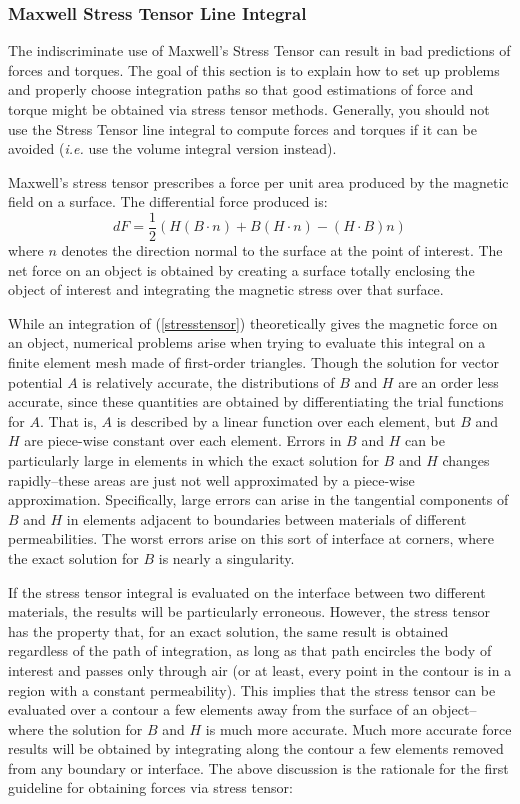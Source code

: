 \documentclass[12pt]{report}
\newcommand{\be}{\begin{equation}}
\newcommand{\ee}{\end{equation}}
\begin{document}
\subsubsection{Maxwell Stress Tensor Line Integral}
The indiscriminate use of Maxwell's Stress Tensor can result in bad
predictions of forces and torques.  The goal of this section is to
explain how to set up problems and properly choose integration
paths so that good estimations of force and torque might be
obtained via stress tensor methods.  Generally, you should not
use the Stress Tensor line integral to compute forces and torques
if it can be avoided ({\em i.e.} use the volume integral version instead).

Maxwell's stress tensor prescribes a force per unit area produced
by the magnetic field on a surface.  The differential force
produced is:
\be \label{stresstensor} dF= \mbox{$\frac{1}{2}$} \left(
H(B \cdot n) + B(H \cdot n) - (H \cdot B) n \right) \ee where $n$
denotes the direction normal to the surface at the point of
interest.  The net force on an object is obtained by creating a
surface totally enclosing the object of interest and integrating
the magnetic stress over that surface.

While an integration of (\ref{stresstensor}) theoretically gives
the magnetic force on an object, numerical problems arise when
trying to evaluate this integral on a finite element mesh made of
first-order triangles.  Though the solution for vector potential
$A$ is relatively accurate, the distributions of $B$ and $H$ are an
order less accurate, since these quantities are obtained by
differentiating the trial functions for $A$.  That is, $A$ is
described by a linear function over each element, but $B$ and $H$
are piece-wise constant over each element.  Errors in $B$ and $H$
can be particularly large in elements in which the exact solution
for $B$ and $H$ changes rapidly--these areas are just not well
approximated by a piece-wise approximation.  Specifically, large
errors can arise in the tangential components of $B$ and $H$ in
elements adjacent to boundaries between materials of different
permeabilities.  The worst errors arise on this sort of interface at
corners, where the exact solution for $B$ is nearly a singularity.

If the stress tensor integral is evaluated on the interface between
two different materials, the results will be particularly
erroneous. However, the stress tensor has the property that, for an
exact solution, the same result is obtained regardless of the path
of integration, as long as that path encircles the body of interest
and passes only through air (or at least, every point in the
contour is in a region with a constant permeability). This implies
that the stress tensor can be evaluated over a contour a few
elements away from the surface of an object--where the solution for
$B$ and $H$ is much more accurate. Much more accurate force results
will be obtained by integrating along the contour a few elements
removed from any boundary or interface. The above discussion is the
rationale for the first guideline for obtaining forces via stress
tensor:
\end{document}
